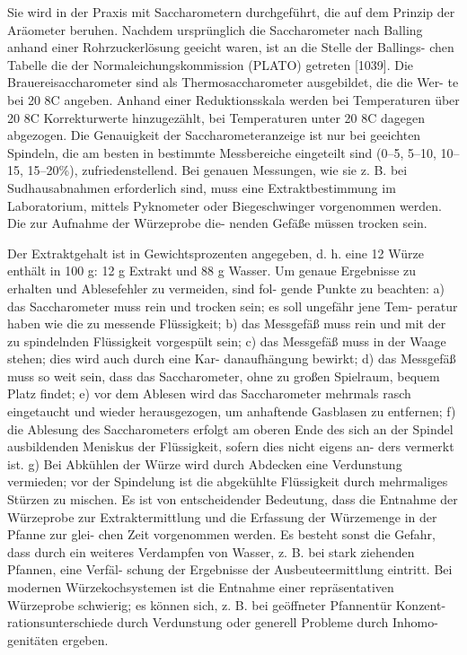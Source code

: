 \documentclass[a4paper,parskip=half]{scrartcl}
\begin{document}
\autocite{Brueckelmeier2018}

Sie wird in der Praxis mit Saccharometern durchgeführt, die auf dem Prinzip
der Aräometer beruhen. Nachdem ursprünglich die Saccharometer nach Balling
anhand einer Rohrzuckerlösung geeicht waren, ist an die Stelle der Ballings-
chen Tabelle die der Normaleichungskommission (PLATO) getreten [1039]. Die
Brauereisaccharometer sind als Thermosaccharometer ausgebildet, die die Wer-
te bei 20 8C angeben. Anhand einer Reduktionsskala werden bei Temperaturen
über 20 8C Korrekturwerte hinzugezählt, bei Temperaturen unter 20 8C dagegen
abgezogen. Die Genauigkeit der Saccharometeranzeige ist nur bei geeichten
Spindeln, die am besten in bestimmte Messbereiche eingeteilt sind (0–5, 5–10,
10–15, 15–20\%), zufriedenstellend.
Bei genauen Messungen, wie sie z. B. bei Sudhausabnahmen erforderlich
sind, muss eine Extraktbestimmung im Laboratorium, mittels Pyknometer oder
Biegeschwinger vorgenommen werden. Die zur Aufnahme der Würzeprobe die-
nenden Gefäße müssen trocken sein.

Der Extraktgehalt ist in Gewichtsprozenten angegeben, d. h. eine 12%
Würze enthält in 100 g: 12 g Extrakt und 88 g Wasser.
Um genaue Ergebnisse zu erhalten und Ablesefehler zu vermeiden, sind fol-
gende Punkte zu beachten:
a) das Saccharometer muss rein und trocken sein; es soll ungefähr jene Tem-
peratur haben wie die zu messende Flüssigkeit;
b) das Messgefäß muss rein und mit der zu spindelnden Flüssigkeit vorgespült
sein;
c) das Messgefäß muss in der Waage stehen; dies wird auch durch eine Kar-
danaufhängung bewirkt;
d) das Messgefäß muss so weit sein, dass das Saccharometer, ohne zu großen
Spielraum, bequem Platz findet;
e) vor dem Ablesen wird das Saccharometer mehrmals rasch eingetaucht und
wieder herausgezogen, um anhaftende Gasblasen zu entfernen;
f) die Ablesung des Saccharometers erfolgt am oberen Ende des sich an der
Spindel ausbildenden Meniskus der Flüssigkeit, sofern dies nicht eigens an-
ders vermerkt ist.
g) Bei Abkühlen der Würze wird durch Abdecken eine Verdunstung vermieden;
vor der Spindelung ist die abgekühlte Flüssigkeit durch mehrmaliges
Stürzen zu mischen.
Es ist von entscheidender Bedeutung, dass die Entnahme der Würzeprobe zur
Extraktermittlung und die Erfassung der Würzemenge in der Pfanne zur glei-
chen Zeit vorgenommen werden. Es besteht sonst die Gefahr, dass durch ein
weiteres Verdampfen von Wasser, z. B. bei stark ziehenden Pfannen, eine Verfäl-
schung der Ergebnisse der Ausbeuteermittlung eintritt.
Bei modernen Würzekochsystemen ist die Entnahme einer repräsentativen
Würzeprobe schwierig; es können sich, z. B. bei geöffneter Pfannentür Konzent-
rationsunterschiede durch Verdunstung oder generell Probleme durch Inhomo-
genitäten ergeben.
\autocite{Narziss2009}
\end{document}
